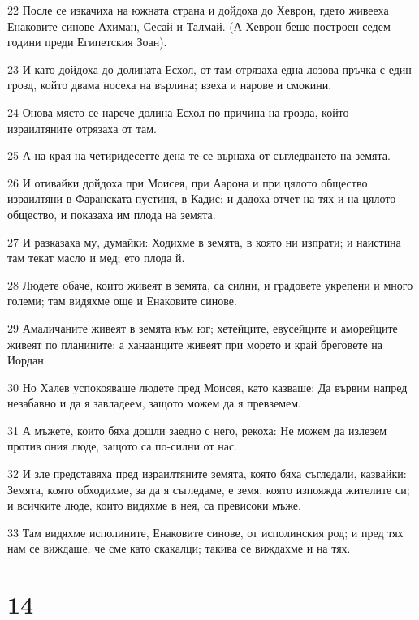 \par 22 После се изкачиха на южната страна и дойдоха до Хеврон, гдето живееха Енаковите синове Ахиман, Сесай и Талмай. (А Хеврон беше построен седем години преди Египетския Зоан).
\par 23 И като дойдоха до долината Есхол, от там отрязаха една лозова пръчка с един грозд, който двама носеха на върлина; взеха и нарове и смокини.
\par 24 Онова място се нарече долина Есхол по причина на грозда, който израилтяните отрязаха от там.
\par 25 А на края на четиридесетте дена те се върнаха от съгледването на земята.
\par 26 И отивайки дойдоха при Моисея, при Аарона и при цялото общество израилтяни в Фаранската пустиня, в Кадис; и дадоха отчет на тях и на цялото общество, и показаха им плода на земята.
\par 27 И разказаха му, думайки: Ходихме в земята, в която ни изпрати; и наистина там текат масло и мед; ето плода й.
\par 28 Людете обаче, които живеят в земята, са силни, и градовете укрепени и много големи; там видяхме още и Енаковите синове.
\par 29 Амаличаните живеят в земята към юг; хетейците, евусейците и аморейците живеят по планините; а ханаанците живеят при морето и край бреговете на Иордан.
\par 30 Но Халев успокояваше людете пред Моисея, като казваше: Да вървим напред незабавно и да я завладеем, защото можем да я превземем.
\par 31 А мъжете, които бяха дошли заедно с него, рекоха: Не можем да излезем против ония люде, защото са по-силни от нас.
\par 32 И зле представяха пред израилтяните земята, която бяха съгледали, казвайки: Земята, която обходихме, за да я съгледаме, е земя, която изпояжда жителите си; и всичките люде, които видяхме в нея, са превисоки мъже.
\par 33 Там видяхме исполините, Енаковите синове, от исполинския род; и пред тях нам се виждаше, че сме като скакалци; такива се виждахме и на тях.

\chapter{14}

